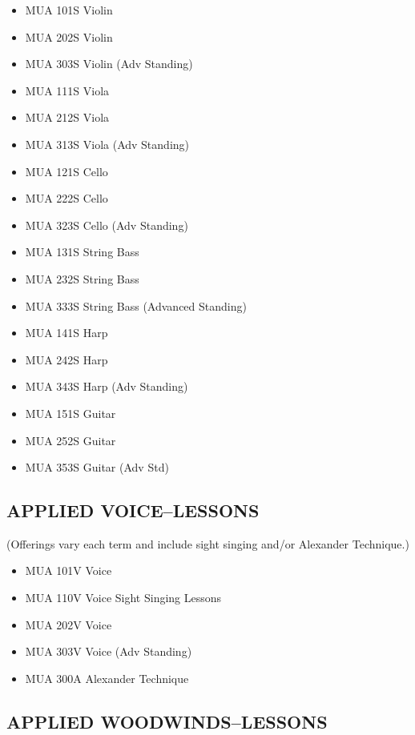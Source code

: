 \documentclass[
  letterpaper,
]{scrbook}
\providecommand{\tightlist}{%
  \setlength{\itemsep}{0pt}\setlength{\parskip}{0pt}}
\begin{document}
\begin{itemize}
\tightlist
\item
  MUA 101S Violin
\item
  MUA 202S Violin
\item
  MUA 303S Violin (Adv Standing)
\item
  MUA 111S Viola
\item
  MUA 212S Viola
\item
  MUA 313S Viola (Adv Standing)
\item
  MUA 121S Cello
\item
  MUA 222S Cello
\item
  MUA 323S Cello (Adv Standing)
\item
  MUA 131S String Bass
\item
  MUA 232S String Bass
\item
  MUA 333S String Bass (Advanced Standing)
\item
  MUA 141S Harp
\item
  MUA 242S Harp
\item
  MUA 343S Harp (Adv Standing)
\item
  MUA 151S Guitar
\item
  MUA 252S Guitar
\item
  MUA 353S Guitar (Adv Std)
\end{itemize}

\subsection{APPLIED VOICE--LESSONS}\label{applied-voicelessons}

(Offerings vary each term and include sight singing and/or Alexander
Technique.)

\begin{itemize}
\tightlist
\item
  MUA 101V Voice
\item
  MUA 110V Voice Sight Singing Lessons
\item
  MUA 202V Voice
\item
  MUA 303V Voice (Adv Standing)
\item
  MUA 300A Alexander Technique
\end{itemize}

\subsection{APPLIED WOODWINDS--LESSONS}\label{applied-woodwindslessons}
\end{document}
